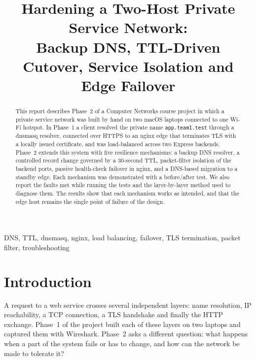 \documentclass[conference]{IEEEtran}
\newcommand{\cmd}[1]{\texttt{#1}}
\begin{document}
\title{Hardening a Two-Host Private Service Network:\\ Backup DNS, TTL-Driven Cutover, Service Isolation and Edge Failover}

\author{
\and
{}
}

\maketitle

\begin{abstract}
This report describes Phase~2 of a Computer Networks course project in which a private service network was built by hand on two macOS laptops connected to one Wi-Fi hotspot. In Phase~1 a client resolved the private name \cmd{app.team1.test} through a dnsmasq resolver, connected over HTTPS to an nginx edge that terminates TLS with a locally issued certificate, and was load-balanced across two Express backends. Phase~2 extends this system with five resilience mechanisms: a backup DNS resolver, a controlled record change governed by a 30-second TTL, packet-filter isolation of the backend ports, passive health-check failover in nginx, and a DNS-based migration to a standby edge. Each mechanism was demonstrated with a before/after test. We also report the faults met while running the tests and the layer-by-layer method used to diagnose them. The results show that each mechanism works as intended, and that the edge host remains the single point of failure of the design.
\end{abstract}

\begin{IEEEkeywords}
DNS, TTL, dnsmasq, nginx, load balancing, failover, TLS termination, packet filter, troubleshooting
\end{IEEEkeywords}

\section{Introduction}
A request to a web service crosses several independent layers: name resolution, IP reachability, a TCP connection, a TLS handshake and finally the HTTP exchange. Phase~1 of the project built each of these layers on two laptops and captured them with Wireshark. Phase~2 asks a different question: what happens when a part of the system fails or has to change, and how can the network be made to tolerate it?
\end{document}
